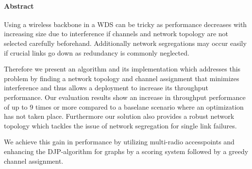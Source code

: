 \cleardoublepage

\vspace {2cm}
\begin{center}
\paragraph{Abstract}
\hrulefill
\end{center}
Using a wireless backbone in a \ac{WDS} can be tricky as performance decreases with increasing size due to interference if 
channels and network topology are not selected carefully beforehand. Additionally network segregations may occur easily if 
crucial links go down as redundancy is commonly neglected.

Therefore we present an algorithm and its implementation which addresses this problem by finding a network topology and channel assignment 
that minimizes interference and thus allows a deployment to increase its throughput performance. 
Our evaluation results show an increase in throughput performance of up to 9 times or more compared to a baselane scenario where an optimization has not taken place.
Furthermore our solution also provides a robust network topology which tackles the issue of network segregation for single link failures.

We achieve this gain in performance by utilizing multi-radio accesspoints and enhancing the \ac{DJP}-algorithm for graphs by a scoring system followed
by a greedy channel assignment.

